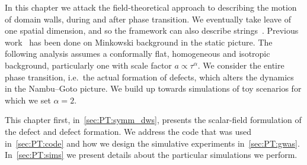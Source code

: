 













In this chapter we attack the field-theoretical approach to describing the motion of domain walls, during and after phase transition. We eventually take leave of one spatial dimension, and so the framework can also describe strings~\citep{blanco-pilladoDynamicsDomainWall2023}. %
Previous work~\citep{blanco-pilladoDynamicsDomainWall2023} has been done on Minkowski background in the static picture. The following analysis assumes a conformally flat, homogeneous and isotropic background, particularly one with scale factor $a\propto \tau^\alpha$. We consider the entire phase transition, i.e.~the actual formation of defects, which alters the dynamics in the Nambu--Goto picture. %
We build up towards simulations of toy scenarios for which we set $\alpha=2$.


This chapter first, in~\cref{sec:PT:symm_dws}, presents the scalar-field formulation of the defect and defect formation. We address the code that was used in~\cref{sec:PT:code} and how we design the simulative experiments in~\cref{sec:PT:gwas}. In~\cref{sec:PT:sims} we present details about the particular simulations we perform.




